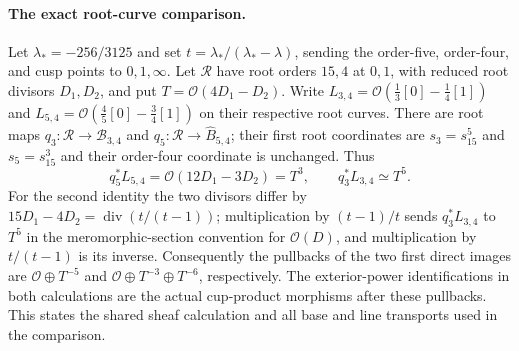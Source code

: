 \paragraph{The exact root-curve comparison.}
Let $\lambda_*=-256/3125$ and set
$t=\lambda_*/(\lambda_*-\lambda)$, sending the order-five,
order-four, and cusp points to $0,1,\infty$.  Let $\mathcal R$
have root orders $15,4$ at $0,1$, with reduced root divisors
$D_1,D_2$, and put $T=\mathcal O(4D_1-D_2)$.
Write $L_{3,4}=\mathcal O(\tfrac13[0]-\tfrac14[1])$ and $L_{5,4}=\mathcal O(\tfrac45[0]-\tfrac34[1])$ on their respective root curves. There are root maps $q_3:\mathcal R\to\mathcal B_{3,4}$ and
$q_5:\mathcal R\to\widehat B_{5,4}$; their first root
coordinates are $s_3=s_{15}^5$ and $s_5=s_{15}^3$ and their
order-four coordinate is unchanged.  Thus
\[
 q_5^*L_{5,4}=\mathcal O(12D_1-3D_2)=T^3,
 \qquad q_3^*L_{3,4}\simeq T^5.
\]
For the second identity the two divisors differ by
$15D_1-4D_2=\operatorname{div}(t/(t-1))$; multiplication by $(t-1)/t$ sends $q_3^*L_{3,4}$ to $T^5$ in the meromorphic-section convention for $\mathcal O(D)$, and multiplication by $t/(t-1)$ is its inverse.
Consequently the pullbacks of the two first direct images are
$\mathcal O\oplus T^{-5}$ and
$\mathcal O\oplus T^{-3}\oplus T^{-6}$, respectively.
The exterior-power identifications in both calculations are
the actual cup-product morphisms after these pullbacks.
This states the shared sheaf calculation and all base and
line transports used in the comparison.
